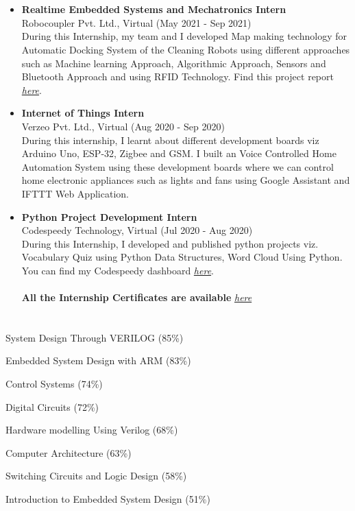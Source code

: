 \documentclass[]{article}
\begin{document}
\section*{\color{blue}{Internships}}%
    \begin{itemize}
    \item \textbf{Realtime Embedded Systems and Mechatronics Intern}\\Robocoupler Pvt. Ltd., Virtual (May 2021 - Sep 2021)\\During this Internship, my team and I developed Map making technology for Automatic Docking System of the Cleaning Robots using different approaches such as Machine learning Approach,  Algorithmic Approach, Sensors and Bluetooth Approach and using RFID Technology. Find this project report \href{https://docs.google.com/document/d/1VjMvaT-iSSNu5BvjKKVbp-ZArXbTHrDEdOdBbaB3qdw/edit?usp=sharing}{\em here}.
	\item \textbf{Internet of Things Intern}\\Verzeo Pvt. Ltd., Virtual (Aug 2020 - Sep 2020)\\During this internship, I learnt about different development boards viz Arduino Uno, ESP-32, Zigbee and GSM. I built an Voice Controlled Home Automation System using these development boards where we can control home electronic appliances such as lights and fans using Google Assistant and IFTTT Web Application.
    	\item \textbf{Python Project Development Intern}\\Codespeedy Technology, Virtual (Jul 2020 - Aug 2020)\\During this Internship, I developed and published python projects viz. Vocabulary Quiz using Python Data Structures, Word Cloud Using Python. You can find my Codespeedy dashboard \href{https://coderspacket.com/contributor/vempatisridharbzy}{\em here}.\\ \\
\textbf{All the Internship Certificates are available }\href{https://drive.google.com/drive/u/0/folders/1X2hJOIpAaPBdThqYgYWMJrkt0Hddwq_q}{\em here}
    \end{itemize}
\section*{\color{blue}{NPTEL Certifications}}
    \begin{itemize}
    \begin{multicols}{2}
      \item System Design Through VERILOG (85\%)
	 \item Embedded System Design with ARM (83\%)
	 \item Control Systems (74\%)
	 \item Digital Circuits (72\%)
	 \item Hardware modelling Using Verilog (68\%)
	 \item Computer Architecture (63\%)
      \item Switching Circuits and Logic Design (58\%)
      \item Introduction to Embedded System Design (51\%)
    \end{multicols}
    \end{itemize}
\end{document}
